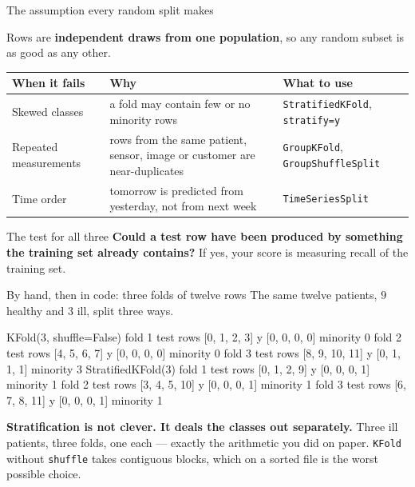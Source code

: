 \documentclass[aspectratio=169]{beamer}
\begin{document}
\begin{frame}[shrink=6]{The assumption every random split makes}
  \begin{exampleblock}{}
    \centering
    Rows are \textbf{independent draws from one population}, so any random
    subset is as good as any other.
  \end{exampleblock}
  \vspace{0.3em}
  \begin{center}\small
  \begin{tabular}{@{}lp{4.3cm}p{4.3cm}@{}}
    \toprule
    \textbf{When it fails} & \textbf{Why} & \textbf{What to use}\\
    \midrule
    Skewed classes & a fold may contain few or no minority rows &
      \texttt{StratifiedKFold}, \texttt{stratify=y}\\[4pt]
    Repeated measurements & rows from the same patient, sensor, image or
      customer are near-duplicates & \texttt{GroupKFold},
      \texttt{GroupShuffleSplit}\\[4pt]
    Time order & tomorrow is predicted from yesterday, not from next week &
      \texttt{TimeSeriesSplit}\\
    \bottomrule
  \end{tabular}
  \end{center}
  \begin{block}{The test for all three}
    \small \textbf{Could a test row have been produced by something the
    training set already contains?} If yes, your score is measuring
    recall of the training set.
  \end{block}
\end{frame}

\begin{frame}[fragile,shrink=8]{By hand, then in code: three folds of twelve rows}
The same twelve patients, $9$ healthy and $3$ ill, split three ways.
\begin{outblk}
   KFold(3, shuffle=False)
      fold 1  test rows [0, 1, 2, 3]    y [0, 0, 0, 0]  minority 0
      fold 2  test rows [4, 5, 6, 7]    y [0, 0, 0, 0]  minority 0
      fold 3  test rows [8, 9, 10, 11]  y [0, 1, 1, 1]  minority 3
   StratifiedKFold(3)
      fold 1  test rows [0, 1, 2, 9]    y [0, 0, 0, 1]  minority 1
      fold 2  test rows [3, 4, 5, 10]   y [0, 0, 0, 1]  minority 1
      fold 3  test rows [6, 7, 8, 11]   y [0, 0, 0, 1]  minority 1
\end{outblk}
\begin{center}\small
  \textbf{Stratification is not clever. It deals the classes out separately.}
  Three ill patients, three folds, one each --- exactly the arithmetic you did
  on paper. \texttt{KFold} without \texttt{shuffle} takes contiguous blocks,
  which on a sorted file is the worst possible choice.
\end{center}
\end{frame}
\end{document}
